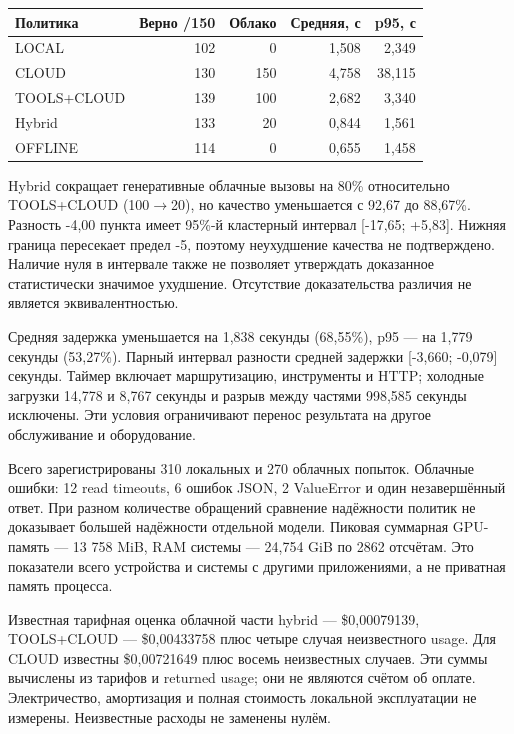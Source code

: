 \documentclass[14pt,a4paper]{extarticle}
\begin{document}
\begin{center}\fontsize{12}{14}\selectfont
\begin{tabular}{lrrrr}\toprule
Политика & Верно /150 & Облако & Средняя, с & p95, с \\
\midrule
LOCAL & 102 & 0 & 1,508 & 2,349 \\
CLOUD & 130 & 150 & 4,758 & 38,115 \\
TOOLS+CLOUD & 139 & 100 & 2,682 & 3,340 \\
Hybrid & 133 & 20 & 0,844 & 1,561 \\
OFFLINE & 114 & 0 & 0,655 & 1,458 \\
\bottomrule\end{tabular}
\end{center}

Hybrid сокращает генеративные облачные вызовы на 80\% относительно TOOLS+CLOUD (100\ensuremath{\to}20), но качество уменьшается с 92,67 до 88,67\%. Разность -4,00 пункта имеет 95\%-й кластерный интервал [-17,65; +5,83]. Нижняя граница пересекает предел -5, поэтому неухудшение качества не подтверждено. Наличие нуля в интервале также не позволяет утверждать доказанное статистически значимое ухудшение. Отсутствие доказательства различия не является эквивалентностью.


Средняя задержка уменьшается на 1,838 секунды (68,55\%), p95 --- на 1,779 секунды (53,27\%). Парный интервал разности средней задержки [-3,660; -0,079] секунды. Таймер включает маршрутизацию, инструменты и HTTP; холодные загрузки 14,778 и 8,767 секунды и разрыв между частями 998,585 секунды исключены. Эти условия ограничивают перенос результата на другое обслуживание и оборудование.


Всего зарегистрированы 310 локальных и 270 облачных попыток. Облачные ошибки: 12 read timeouts, 6 ошибок JSON, 2 ValueError и один незавершённый ответ. При разном количестве обращений сравнение надёжности политик не доказывает большей надёжности отдельной модели. Пиковая суммарная GPU-память --- 13 758 MiB, RAM системы --- 24,754 GiB по 2862 отсчётам. Это показатели всего устройства и системы с другими приложениями, а не приватная память процесса.


Известная тарифная оценка облачной части hybrid --- \$0,00079139, TOOLS+CLOUD --- \$0,00433758 плюс четыре случая неизвестного usage. Для CLOUD известны \$0,00721649 плюс восемь неизвестных случаев. Эти суммы вычислены из тарифов и returned usage; они не являются счётом об оплате. Электричество, амортизация и полная стоимость локальной эксплуатации не измерены. Неизвестные расходы не заменены нулём.
\end{document}
